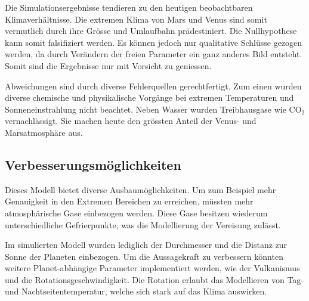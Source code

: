 \begin{refsection}
Die Simulationsergebnisse tendieren zu den heutigen beobachtbaren Klimaverhältnisse. Die extremen Klima von Mars und Venus sind somit vermutlich durch ihre Grösse und Umlaufbahn prädestiniert. Die Nullhypothese kann somit falsifiziert werden. Es können jedoch nur qualitative Schlüsse gezogen werden, da durch Verändern der freien Parameter ein ganz anderes Bild entsteht. Somit sind die Ergebnisse nur mit Vorsicht zu geniessen.

Abweichungen sind durch diverse Fehlerquellen gerechtfertigt. Zum einen wurden diverse chemische und physikalische Vorgänge bei extremen Temperaturen und Sonneneinstrahlung nicht beachtet.
Neben Wasser wurden Treibhausgase wie CO$_2$ vernachlässigt. Sie machen heute den grössten Anteil der Venus- und Marsatmosphäre aus.

\subsection{Verbesserungsmöglichkeiten}

Dieses Modell bietet diverse Ausbaumöglichkeiten. Um zum Beispiel mehr Genauigkeit in den Extremen Bereichen zu erreichen, müssten mehr atmosphärische Gase einbezogen werden.
Diese Gase besitzen wiederum unterschiedliche Gefrierpunkte, was die Modellierung der Vereisung zulässt.
		
Im simulierten Modell wurden lediglich der Durchmesser und die Distanz zur Sonne der Planeten einbezogen. Um die Aussagekraft zu verbessern könnten weitere Planet-abhängige Parameter implementiert werden, wie der Vulkanismus und die Rotationsgeschwindigkeit. Die Rotation erlaubt das Modellieren von Tag- und Nachtseitentemperatur, welche sich stark auf das Klima auswirken.

\printbibliography[heading=subbibliography]
\end{refsection}
